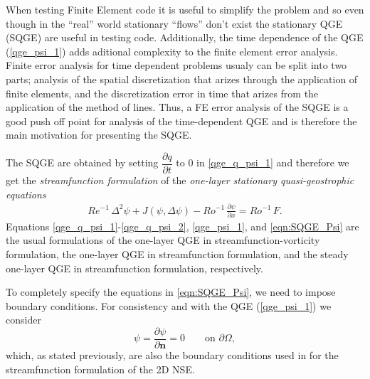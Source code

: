 When testing Finite Element code it is useful to simplify the problem and so
even though in the ``real'' world stationary ``flows'' don't exist the
stationary QGE (SQGE) are useful in testing code.  Additionally, the time
dependence of the QGE (\eqref{qge_psi_1}) adds aditional complexity to the
finite element error analysis. Finite error analysis for time dependent problems
usualy can be split into two parts; analysis of the spatial discretization that
arizes through the application of finite elements, and the discretization error
in time that arizes from the application of the method of lines. Thus, a FE
error analysis of the SQGE is a good push off point for analysis of the
time-dependent QGE and is therefore the main motivation for presenting the SQGE.

The SQGE are obtained by setting $\dfrac{\partial q}{\partial t}$ to $0$ in
\eqref{qge_q_psi_1} and therefore we get the \emph{streamfunction formulation}
of the \emph{one-layer stationary quasi-geostrophic equations}
\begin{eqnarray}
  Re^{-1} \, \Delta^2 \psi + J(\psi , \Delta \psi) - Ro^{-1} \, \frac{\partial
    \psi}{\partial x} = Ro^{-1} \, F .
  \label{eqn:SQGE_Psi}
\end{eqnarray}
Equations \eqref{qge_q_psi_1}-\eqref{qge_q_psi_2}, \eqref{qge_psi_1}, and
\eqref{eqn:SQGE_Psi} are the usual formulations of the one-layer QGE in
streamfunction-vorticity formulation, the one-layer QGE in streamfunction
formulation, and the steady one-layer QGE in streamfunction formulation,
respectively.

To completely specify the equations in \eqref{eqn:SQGE_Psi}, we need to impose
boundary conditions. For consistency and with the QGE (\eqref{qge_psi_1})  we
consider
\begin{equation*}
  \psi = \frac{\partial \psi}{\partial \mathbf{n}} = 0 \qquad \text{on } \partial \Omega,
\end{equation*}
which, as stated previously, are also the boundary conditions used in
\cite{Gunzburger89} for the streamfunction formulation of the 2D NSE.

